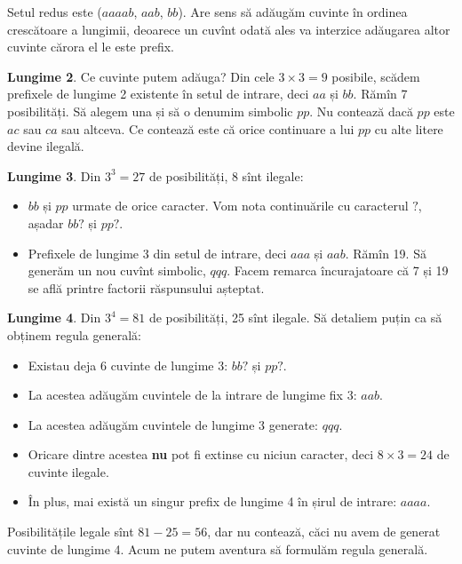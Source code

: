 \documentclass[../main.tex]{subfiles}
\begin{document}
Setul redus este ($aaaab$, $aab$, $bb$). Are sens să adăugăm cuvinte în ordinea crescătoare a lungimii, deoarece un cuvînt odată ales va interzice adăugarea altor cuvinte cărora el le este prefix.

\textbf{Lungime 2}. Ce cuvinte putem adăuga? Din cele $3 \times 3 = 9$ posibile, scădem prefixele de lungime 2 existente în setul de intrare, deci $aa$ și $bb$. Rămîn 7 posibilități. Să alegem una și să o denumim simbolic $pp$. Nu contează dacă $pp$ este $ac$ sau $ca$ sau altceva. Ce contează este că orice continuare a lui $pp$ cu alte litere devine ilegală.

\textbf{Lungime 3}. Din $3^3 = 27$ de posibilități, 8 sînt ilegale:

\begin{itemize}
  \item $bb$ și $pp$ urmate de orice caracter. Vom nota continuările cu caracterul $?$, așadar $bb?$ și $pp?$.
  \item Prefixele de lungime 3 din setul de intrare, deci $aaa$ și $aab$. Rămîn 19. Să generăm un nou cuvînt simbolic, $qqq$. Facem remarca încurajatoare că 7 și 19 se află printre factorii răspunsului așteptat.
\end{itemize}

\textbf{Lungime 4}. Din $3^4 = 81$ de posibilități, 25 sînt ilegale. Să detaliem puțin ca să obținem regula generală:

\begin{itemize}
  \item Existau deja 6 cuvinte de lungime 3: $bb?$ și $pp?$.
  \item La acestea adăugăm cuvintele de la intrare de lungime fix 3: $aab$.
  \item La acestea adăugăm cuvintele de lungime 3 generate: $qqq$.
  \item Oricare dintre acestea \textbf{nu} pot fi extinse cu niciun caracter, deci $8 \times 3 = 24$ de cuvinte ilegale.
  \item În plus, mai există un singur prefix de lungime 4 în șirul de intrare: $aaaa$.
\end{itemize}

Posibilitățile legale sînt $81-25=56$, dar nu contează, căci nu avem de generat cuvinte de lungime 4. Acum ne putem aventura să formulăm regula generală.
\end{document}
